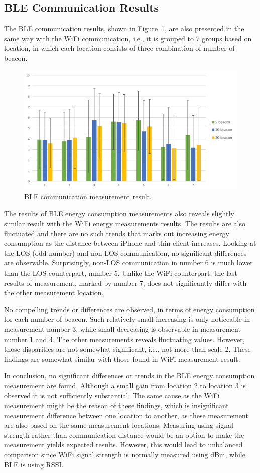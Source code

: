 \documentclass[journal]{vgtc}                %
\begin{document}
\subsection{BLE Communication Results} %
\label{sub:ble_communication_results}
The BLE communication results, shown in Figure~\ref{fig:ble-result}, are also presented in the same way with the WiFi communication, i.e., it is grouped to 7 groups based on location, in which each location consists of three combination of number of beacon.

\begin{figure}
  \centering
    \includegraphics[width=.5\textwidth]{ble}
  \caption{BLE communication measurement result.}
  \label{fig:ble-result}
\end{figure}

The results of BLE energy consumption measurements also reveals slightly similar result with the WiFi energy measurements results. The results are also fluctuated and there are no such trends that marks out increasing energy consumption as the distance between iPhone and thin client increases. Looking at the LOS (odd number) and non-LOS communication, no significant differences are observable. Surprisingly, non-LOS communication in number 6 is much lower than the LOS counterpart, number 5. Unlike the WiFi counterpart, the last results of measurement, marked by number 7, does not significantly differ with the other measurement location.

No compelling trends or differences are observed, in terms of energy consumption for each number of beacon. Such relatively small increasing is only noticeable in measurement number 3, while small decreasing is observable in measurement number 1 and 4. The other measurements reveals fluctuating values. However, those disparities are not somewhat significant, i.e., not more than scale 2. These findings are somewhat similar with those found in WiFi measurement result.

In conclusion, no significant differences or trends in the BLE energy consumption measurement are found. Although a small gain from location 2 to location 3 is observed it is not sufficiently substantial. The same cause as the WiFi measurement might be the reason of these findings, which is insignificant measurement difference between one location to another, as these measurement are also based on the same measurement locations. Measuring using signal strength rather than communication distance would be an option to make the measurement yields expected results. However, this would lead to unbalanced comparison since WiFi signal strength is normally measured using dBm, while BLE is using RSSI.
\end{document}
